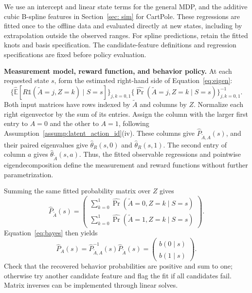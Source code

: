\documentclass[12pt]{article}
\newcommand{\0}{\boldsymbol{0}}
\newcommand{\E}{\mathbb{E}}
\begin{document}
We use an intercept and linear state terms for the general MDP, and the additive cubic B-spline features in Section~\ref{sec: sim} for CartPole. These regressions are fitted once to the offline data and evaluated directly at new states, including by extrapolation outside the observed ranges. For spline predictions, retain the fitted knots and basis specification. The candidate-feature definitions and regression specifications are fixed before policy evaluation.

\textbf{Measurement model, reward function, and behavior policy.}
At each requested state $s$, form the estimated right-hand side of Equation~\eqref{eq:eigen}:
\[
\bigl\{\widehat{\E}[R\mathds{1}(\widetilde A=j,Z=k)\mid S=s]\bigr\}_{j,k=0,1}
\bigl\{\widehat{\Pr}(\widetilde A=j,Z=k\mid S=s)\bigr\}_{j,k=0,1}^{-1}.
\]
Both input matrices have rows indexed by $\widetilde A$ and columns by $Z$. Normalize each right eigenvector by the sum of its entries. Assign the column with the larger first entry to $A=0$ and the other to $A=1$, following Assumption~\ref{assump:latent_action_id}(iv). These columns give $\widehat P_{\widetilde A,A}(s)$, and their paired eigenvalues give $\widehat\theta_R(s,0)$ and $\widehat\theta_R(s,1)$. The second entry of column $a$ gives $\widehat\theta_{\widetilde A}(s,a)$. Thus, the fitted observable regressions and pointwise eigendecomposition define the measurement and reward functions without further parametrization.

Summing the same fitted probability matrix over $Z$ gives
\[
\widehat P_{\widetilde A}(s)=
\begin{pmatrix}
\sum_{k=0}^1\widehat{\Pr}(\widetilde A=0,Z=k\mid S=s)\\
\sum_{k=0}^1\widehat{\Pr}(\widetilde A=1,Z=k\mid S=s)
\end{pmatrix}.
\]
Equation~\eqref{eq:bayes} then yields
\[
\widehat P_A(s)
=\widehat P_{\widetilde A,A}^{-1}(s)\widehat P_{\widetilde A}(s)
=\begin{pmatrix}\widehat b(0\mid s)\\\widehat b(1\mid s)\end{pmatrix}.
\]
Check that the recovered behavior probabilities are positive and sum to one; otherwise try another candidate feature and flag the fit if all candidates fail. Matrix inverses can be implemented through linear solves.
\end{document}
